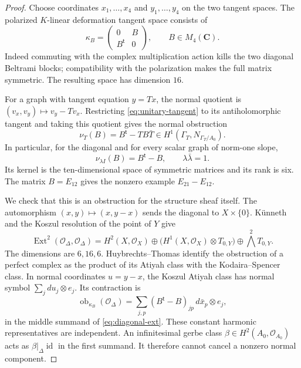 \documentclass[11pt]{article}
\theoremstyle{definition}
\theoremstyle{remark}
\newcommand{\C}{\mathbf C}
\begin{document}
\begin{proof}
Choose coordinates $x_1,\ldots,x_4$ and $y_1,\ldots,y_4$ on the two tangent spaces. The polarized $K$-linear deformation tangent space consists of
\begin{equation}\label{eq:unitary-tangent}
 \kappa_B=\begin{pmatrix}0&B\\B^{\mathsf t}&0\end{pmatrix},
 \qquad B\in M_4(\C).
\end{equation}
Indeed commuting with the complex multiplication action kills the two diagonal Beltrami blocks; compatibility with the polarization makes the full matrix symmetric. The resulting space has dimension $16$.

For a graph with tangent equation $y=Tx$, the normal quotient is $(v_x,v_y)\mapsto v_y-Tv_x$. Restricting \eqref{eq:unitary-tangent} to its antiholomorphic tangent and taking this quotient gives the normal obstruction
\[
 \nu_T(B)=B^{\mathsf t}-TB\bar T
 \in H^1(\Gamma_T,N_{\Gamma_T/A_0}).
\]
In particular, for the diagonal and for every scalar graph of norm-one slope,
\begin{equation}\label{eq:graph-normal-obstruction}
 \nu_{\lambda I}(B)=B^{\mathsf t}-B,
 \qquad \lambda\bar\lambda=1.
\end{equation}
Its kernel is the ten-dimensional space of symmetric matrices and its rank is six. The matrix $B=E_{12}$ gives the nonzero example $E_{21}-E_{12}$.

We check that this is an obstruction for the structure sheaf itself. The automorphism $(x,y)\mapsto(x,y-x)$ sends the diagonal to $X\times\{0\}$. K\"unneth and the Koszul resolution of the point of $Y$ give
\begin{equation}\label{eq:diagonal-ext}
 \operatorname{Ext}^2(\mathcal O_\Delta,\mathcal O_\Delta)
 =H^2(X,\mathcal O_X)
 \oplus\bigl(H^1(X,\mathcal O_X)\otimes T_{0,Y}\bigr)
 \oplus\bigwedge^2T_{0,Y}.
\end{equation}
The dimensions are $6,16,6$. Huybrechts--Thomas \cite[Corollary~3.4, manuscript p.~14]{HT} identify the obstruction of a perfect complex as the product of its Atiyah class with the Kodaira--Spencer class. In normal coordinates $u=y-x$, the Koszul Atiyah class has normal symbol $\sum_jdu_j\otimes e_j$. Its contraction is
\[
 \operatorname{ob}_{\kappa_B}(\mathcal O_\Delta)
 =\sum_{j,p}(B^{\mathsf t}-B)_{jp}\,
 d\bar x_p\otimes e_j,
\]
in the middle summand of \eqref{eq:diagonal-ext}. These constant harmonic representatives are independent. An infinitesimal gerbe class $\beta\in H^2(A_0,\mathcal O_{A_0})$ acts as $\beta|_\Delta\operatorname{id}$ in the first summand. It therefore cannot cancel a nonzero normal component.


\end{proof}
\end{document}
